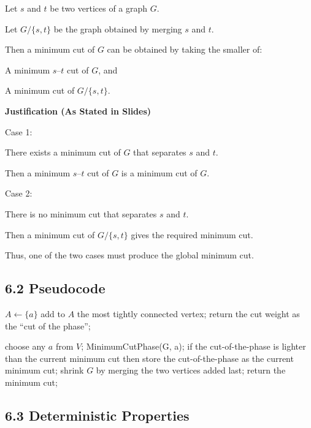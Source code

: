 \documentclass[11pt]{article}
\begin{document}
Let $s$ and $t$ be two vertices of a graph $G$.

Let $G/\{s,t\}$ be the graph obtained by merging $s$ and $t$.

Then a minimum cut of $G$ can be obtained by taking the smaller of:

A minimum $s$–$t$ cut of $G$, and

A minimum cut of $G/\{s,t\}$.

\textbf{Justification (As Stated in Slides)}

Case 1:

There exists a minimum cut of $G$ that separates $s$ and $t$.

Then a minimum $s$–$t$ cut of $G$ is a minimum cut of $G$.

Case 2:

There is no minimum cut that separates $s$ and $t$.

Then a minimum cut of $G/\{s,t\}$ gives the required minimum cut.

Thus, one of the two cases must produce the global minimum cut.

\subsection*{6.2 Pseudocode}

\begin{algorithm}
\caption{Algorithm 1: MinimumCutPhase(G, a)}
\begin{algorithmic}
\STATE $A \leftarrow \{a\}$
\STATE add to $A$ the most tightly connected vertex;
\ENDWHILE
\STATE return the cut weight as the “cut of the phase”;
\end{algorithmic}
\end{algorithm}

\begin{algorithm}
\caption{Algorithm 2: MinimumCut(G)}
\begin{algorithmic}
\STATE choose any $a$ from $V$;
\STATE MinimumCutPhase(G, a);
\STATE if the cut-of-the-phase is lighter than the current minimum cut then
\STATE store the cut-of-the-phase as the current minimum cut;
\STATE shrink $G$ by merging the two vertices added last;
\ENDWHILE
\STATE return the minimum cut;
\end{algorithmic}
\end{algorithm}

\subsection*{6.3 Deterministic Properties}
\end{document}
